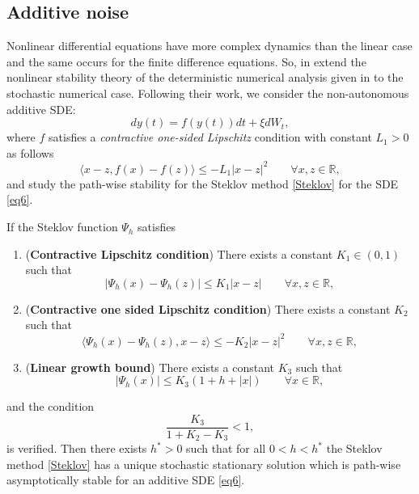 \subsection{Additive noise}
    Nonlinear differential equations have more complex  dynamics than the linear case and
the same  occurs for the finite difference equations. So,  \citeauthor*{Caraballo2006} in
\cite{Caraballo2006}  extend the nonlinear stability theory of the deterministic
numerical  analysis given in \cite{kloeden1999towards} to the stochastic numerical
case. Following  their work,  we consider the non-autonomous additive SDE:
\begin{equation}\label{eq6}
	dy(t)=f(y(t))dt+\xi dW_t,
\end{equation}
where $f$ satisfies a {\it contractive one-sided Lipschitz} condition with constant
$L_1>0$ as follows
\begin{equation}\label{cl}
	\langle
	x-z,f(x)-f(z)
	\rangle\leq
	-L_1|x-z|^2\qquad \forall x,z\in \mathbb{R},
\end{equation}
and study the path-wise stability for the Steklov method \eqref{Steklov} for the SDE
\eqref{eq6}.
\begin{thm}
	If the Steklov function $\Psi_h$  satisfies
	\begin{enumerate}[({A}1)]
		\item (\textbf{Contractive Lipschitz condition})
			There exists  a constant $K_1\in (0,1)$ such that
			$$
				|\Psi_h(x)-\Psi_h(z)|\leq K_1|x-z| \qquad\forall x,z\in \mathbb{R},
			$$
		\item (\textbf{Contractive one sided Lipschitz condition})
			There exists a constant $K_2$ such that
			$$
			\langle
			\Psi_h(x)-\Psi_h(z),x-z
			\rangle
			\leq
			-K_2|x-z|^2 \qquad \forall x,z\in \mathbb{R},
			$$
	\item (\textbf{Linear growth bound})
		There exists a constant $K_3$ such that
		$$|\Psi_h(x)|\leq K_3(1+h+|x|) \qquad \forall x\in \mathbb{R},$$
	\end{enumerate}
	and the  condition
	\begin{equation}\label{c1}
		\frac{K_3}{1+K_2-K_3}< 1,
	\end{equation}
	is verified. Then there exists $h^*>0$ such that for all $0<h<h^*$ the Steklov
	method \eqref{Steklov} has a unique stochastic stationary solution which is
	path-wise asymptotically stable for an additive SDE \eqref{eq6}.
\end{thm}
